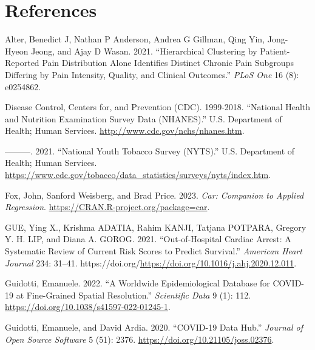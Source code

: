 \documentclass[
  letterpaper,
]{krantz}
\newlength{\cslhangindent}
\newlength{\cslentryspacingunit} %
\newenvironment{CSLReferences}[2] %
 {%
  \setlength{\parindent}{0pt}
  \ifodd #1
  \let\oldpar\par
  \def\par{\hangindent=\cslhangindent\oldpar}
  \fi
  \setlength{\parskip}{#2\cslentryspacingunit}
 }%
 {}
\begin{document}

\hypertarget{references}{%
\chapter*{References}\label{references}}


\hypertarget{refs}{}
\begin{CSLReferences}{1}{0}
\leavevmode{}%
Alter, Benedict J, Nathan P Anderson, Andrea G Gillman, Qing Yin,
Jong-Hyeon Jeong, and Ajay D Wasan. 2021. {``Hierarchical Clustering by
Patient-Reported Pain Distribution Alone Identifies Distinct Chronic
Pain Subgroups Differing by Pain Intensity, Quality, and Clinical
Outcomes.''} \emph{PLoS One} 16 (8): e0254862.

\leavevmode{}%
Disease Control, Centers for, and Prevention (CDC). 1999-2018.
{``{National Health and Nutrition Examination Survey Data (NHANES)}.''}
U.S. Department of Health; Human Services.
\url{http://www.cdc.gov/nchs/nhanes.htm}.

\leavevmode{}%
---------. 2021. {``{National Youth Tobacco Survey (NYTS)}.''} U.S.
Department of Health; Human Services.
\url{https://www.cdc.gov/tobacco/data_statistics/surveys/nyts/index.htm}.

\leavevmode{}%
Fox, John, Sanford Weisberg, and Brad Price. 2023. \emph{Car: Companion
to Applied Regression}. \url{https://CRAN.R-project.org/package=car}.

\leavevmode{}%
GUE, Ying X., Krishma ADATIA, Rahim KANJI, Tatjana POTPARA, Gregory Y.
H. LIP, and Diana A. GOROG. 2021. {``Out-of-Hospital Cardiac Arrest: A
Systematic Review of Current Risk Scores to Predict Survival.''}
\emph{American Heart Journal} 234: 31--41.
https://doi.org/\url{https://doi.org/10.1016/j.ahj.2020.12.011}.

\leavevmode{}%
Guidotti, Emanuele. 2022. {``A Worldwide Epidemiological Database for
COVID-19 at Fine-Grained Spatial Resolution.''} \emph{Scientific Data} 9
(1): 112. \url{https://doi.org/10.1038/s41597-022-01245-1}.

\leavevmode{}%
Guidotti, Emanuele, and David Ardia. 2020. {``COVID-19 Data Hub.''}
\emph{Journal of Open Source Software} 5 (51): 2376.
\url{https://doi.org/10.21105/joss.02376}.


\end{CSLReferences}
\end{document}
